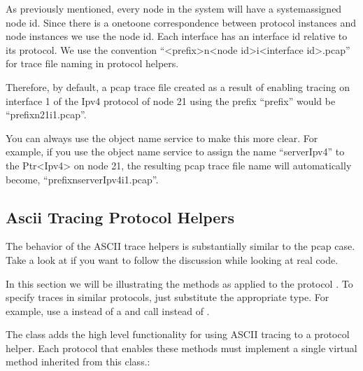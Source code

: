 \documentclass[letterpaper,10pt,english]{sphinxmanual}
\renewcommand{\sphinxcode}[1]{\texttt{\small{#1}}}
\begin{document}
As previously mentioned, every node in the system will have a system\sphinxhyphen{}assigned
node id. Since there is a one\sphinxhyphen{}to\sphinxhyphen{}one correspondence between protocol instances
and node instances we use the node id. Each interface has an interface id
relative to its protocol. We use the convention “\textless{}prefix\textgreater{}\sphinxhyphen{}n\textless{}node id\textgreater{}\sphinxhyphen{}i\textless{}interface
id\textgreater{}.pcap” for trace file naming in protocol helpers.

Therefore, by default, a pcap trace file created as a result of enabling tracing
on interface 1 of the Ipv4 protocol of node 21 using the prefix “prefix”
would be “prefix\sphinxhyphen{}n21\sphinxhyphen{}i1.pcap”.

You can always use the  object name service to make this more clear.
For example, if you use the object name service to assign the name “serverIpv4”
to the Ptr\textless{}Ipv4\textgreater{} on node 21, the resulting pcap trace file name will
automatically become, “prefix\sphinxhyphen{}nserverIpv4\sphinxhyphen{}i1.pcap”.


\subsection{Ascii Tracing Protocol Helpers}
\label{\detokenize{tracing:ascii-tracing-protocol-helpers}}
The behavior of the ASCII trace helpers is substantially similar to the pcap
case.  Take a look at \sphinxcode{\sphinxupquote{src/network/helper/trace\sphinxhyphen{}helper.h}} if you want to follow the
discussion while looking at real code.

In this section we will be illustrating the methods as applied to the protocol
\sphinxcode{}. To specify traces in similar protocols, just substitute the
appropriate type. For example, use a \sphinxcode{} instead of a \sphinxcode{}
and call \sphinxcode{} instead of \sphinxcode{}.

The class \sphinxcode{} adds the high level functionality for
using ASCII tracing to a protocol helper. Each protocol that enables these
methods must implement a single virtual method inherited from this class.:

\begin{sphinxVerbatim}[commandchars=\\\{\}]
      
                                           
\end{sphinxVerbatim}
\end{document}
